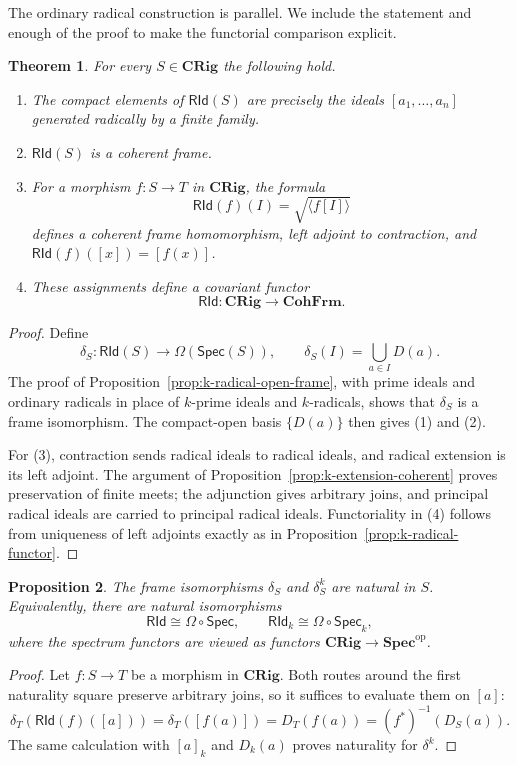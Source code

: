 \documentclass[12pt,leqno]{amsart}
\newcommand{\CRig}{\mathbf{CRig}}
\newcommand{\SpecSp}{\mathbf{Spec}}
\newcommand{\CohFrm}{\mathbf{CohFrm}}
\newcommand{\Spec}{\mathsf{Spec}}
\newcommand{\Speck}{\mathsf{Spec}_{k}}
\newcommand{\RId}{\mathsf{RId}}
\newcommand{\RIdk}{\mathsf{RId}_{k}}
\newcommand{\op}{\mathrm{op}}
\newtheorem{theorem}{Theorem}[section]
\newtheorem{proposition}[theorem]{Proposition}
\theoremstyle{definition}
\numberwithin{equation}{section}
\theoremstyle{remark}
\begin{document}
The ordinary radical construction is parallel. We include the statement and enough of the proof to make the functorial comparison explicit.

\begin{theorem}\label{thm:radical-functor}
For every \(S\in\CRig\) the following hold.
\begin{enumerate}
\item The compact elements of \(\RId(S)\) are precisely the ideals \([a_1,\ldots,a_n]\) generated radically by a finite family.
\item \(\RId(S)\) is a coherent frame.
\item For a morphism \(f\colon S\to T\) in \(\CRig\), the formula
\[
\RId(f)(I)=\sqrt{\langle f[I]\rangle}
\]
defines a coherent frame homomorphism, left adjoint to contraction, and
\(\RId(f)([x])=[f(x)]\).
\item These assignments define a covariant functor
\[
\RId\colon\CRig\longrightarrow\CohFrm.
\]
\end{enumerate}
\end{theorem}

\begin{proof}
Define
\[
\delta_S\colon\RId(S)\longrightarrow\Omega(\Spec(S)),
\qquad
\delta_S(I)=\bigcup_{a\in I}D(a).
\]
The proof of Proposition~\ref{prop:k-radical-open-frame}, with prime ideals and ordinary radicals in place of $k$-prime ideals and $k$-radicals, shows that \(\delta_S\) is a frame isomorphism. The compact-open basis \(\{D(a)\}\) then gives (1) and (2).

For (3), contraction sends radical ideals to radical ideals, and radical extension is its left adjoint. The argument of Proposition~\ref{prop:k-extension-coherent} proves preservation of finite meets; the adjunction gives arbitrary joins, and principal radical ideals are carried to principal radical ideals. Functoriality in (4) follows from uniqueness of left adjoints exactly as in Proposition~\ref{prop:k-radical-functor}.
\end{proof}

\begin{proposition}\label{prop:natural-spectral-representations}
The frame isomorphisms \(\delta_S\) and \(\delta^k_S\) are natural in $S$. Equivalently, there are natural isomorphisms
\[
\RId\cong\Omega\circ\Spec,
\qquad
\RIdk\cong\Omega\circ\Speck,
\]
where the spectrum functors are viewed as functors \(\CRig\to\SpecSp^{\op}\).
\end{proposition}

\begin{proof}
Let \(f\colon S\to T\) be a morphism in \(\CRig\). Both routes around the first naturality square preserve arbitrary joins, so it suffices to evaluate them on \([a]\):
\[
\delta_T(\RId(f)([a]))
 =\delta_T([f(a)])
 =D_T(f(a))
 =(f^*)^{-1}(D_S(a)).
\]
The same calculation with \([a]_k\) and \(D_k(a)\) proves naturality for \(\delta^k\).
\end{proof}
\end{document}
